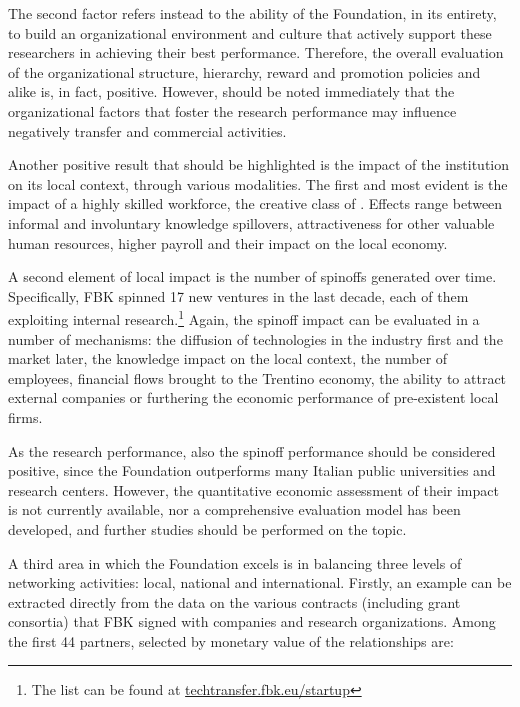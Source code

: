 The second factor refers instead to the ability of the Foundation, in its entirety, to build an organizational environment and culture that actively support these researchers in achieving their best performance. Therefore, the overall evaluation of the organizational structure, hierarchy, reward and promotion policies and alike is, in fact, positive. However, should be noted immediately that the organizational factors that foster the research performance may influence negatively transfer and commercial activities.

Another positive result that should be highlighted is the impact of the institution on its local context, through various modalities. The first and most evident is the impact of a highly skilled workforce, the creative class of \citet{Florida2002}. Effects range between informal and involuntary knowledge spillovers, attractiveness for other valuable human resources, higher payroll and their impact on the local economy. 

A second element of local impact is the number of spinoffs generated over time. Specifically, FBK spinned 17 new ventures in the last decade, each of them exploiting internal research.\footnote{The list can be found at \href{https://techtransfer.fbk.eu/startup/}{techtransfer.fbk.eu/startup}}
Again, the spinoff impact can be evaluated in a number of mechanisms: the diffusion of technologies in the industry first and the market later, the knowledge impact on the local context, the number of employees, financial flows brought to the Trentino economy, the ability to attract external companies or furthering the economic performance of pre-existent local firms. 

As the research performance, also the spinoff performance should be considered positive, since the Foundation outperforms many Italian public universities and research centers. However, the quantitative economic assessment of their impact is not currently available, nor a comprehensive evaluation model has been developed, and further studies should be performed on the topic.

A third area in which the Foundation excels is in balancing three levels of networking activities: local, national and international. Firstly, an example can be extracted directly from the data on the various contracts (including grant consortia) that FBK signed with companies and research organizations. Among the first 44 partners, selected by monetary value of the relationships are:

